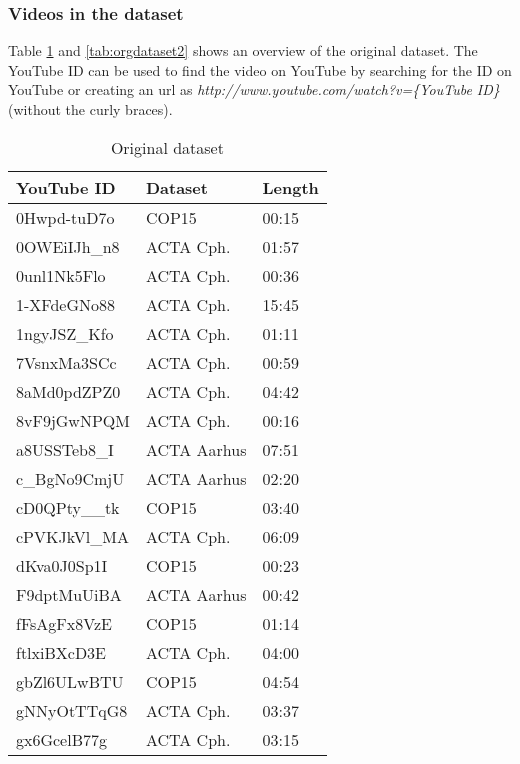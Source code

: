 \subsubsection{Videos in the dataset}
%
Table \ref{tab:orgdataset1} and \ref{tab:orgdataset2} shows an overview of the original dataset. The YouTube ID can be used to find the video on YouTube by searching for the ID on YouTube or creating an url as \emph{http://www.youtube.com/watch?v=\{YouTube ID\}} (without the curly braces).
%
\begin{table}[!ht]
	\begin{center}
	\caption{Original dataset}
	\label{tab:orgdataset1}
		\begin{tabular}{lll}
		\toprule
			YouTube ID & Dataset & Length \\
			\midrule
			0Hwpd-tuD7o & COP15 & 00:15 \\
			0OWEiIJh\_n8 & ACTA Cph. & 01:57 \\
			0unl1Nk5Flo & ACTA Cph. & 00:36 \\
			1-XFdeGNo88 & ACTA Cph. & 15:45 \\
			1ngyJSZ\_Kfo & ACTA Cph. & 01:11 \\
			7VsnxMa3SCc & ACTA Cph. & 00:59 \\
			8aMd0pdZPZ0 & ACTA Cph. & 04:42 \\
			8vF9jGwNPQM & ACTA Cph. & 00:16 \\
			a8USSTeb8\_I & ACTA Aarhus & 07:51 \\
			c\_BgNo9CmjU & ACTA Aarhus & 02:20 \\
			cD0QPty\_\_tk & COP15 & 03:40 \\
			cPVKJkVl\_MA & ACTA Cph. & 06:09 \\
			dKva0J0Sp1I & COP15 & 00:23 \\
			F9dptMuUiBA & ACTA Aarhus & 00:42 \\
			fFsAgFx8VzE & COP15 & 01:14 \\
			ftlxiBXcD3E & ACTA Cph. & 04:00 \\
			gbZl6ULwBTU & COP15 & 04:54 \\
			gNNyOtTTqG8 & ACTA Cph. & 03:37 \\
			gx6GcelB77g & ACTA Cph. & 03:15 \\

\end{tabular}
\end{center}
\end{table}

